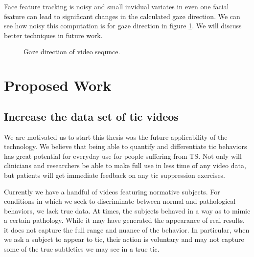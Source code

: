 \documentclass[11pt]{article}
\begin{document}
Face feature tracking is noisy and small invidual variates in even one facial feature can lead to significant changes in the calculated gaze direction. We can see how noisy this computation is for gaze direction in figure \ref{gazegraph}. We will discuss better techniques in future work.
\begin{figure}%
    \centering
    \caption{Gaze direction of video sequnce.}
    \label{gazegraph}%
\end{figure}

\section{Proposed Work}
\subsection{Increase the data set of tic videos}
We are motivated us to start this thesis was the future applicability of the technology. We believe that being able to quantify and differentiate tic behaviors has great potential for everyday use for people suffering from TS. Not only will clinicians and researchers be able to make full use in less time of any video data, but patients will get immediate feedback on any tic suppression exercises.

Currently we have a handful of videos featuring normative subjects. For conditions in which we seek to discriminate between normal and pathological behaviors, we lack true data. At times, the subjects behaved in a way as to mimic a certain pathology. While it may have generated the appearance of real results, it does not capture the full range and nuance of the behavior. In particular, when we ask a subject to appear to tic, their action is voluntary and may not capture some of the true subtleties we may see in a true tic.
\end{document}
